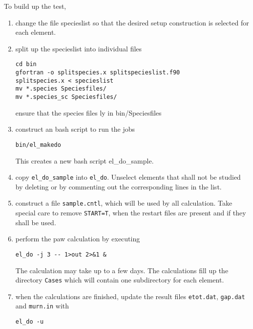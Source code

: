 \documentclass{book}
\begin{document}
To build up the test, 
\begin{enumerate}
\item change the file specieslist so that the desired setup
  construction is selected for each element.
%
\item split up the specieslist into individual files
\begin{verbatim}
cd bin
gfortran -o splitspecies.x splitspecieslist.f90
splitspecies.x < specieslist 
mv *.species Speciesfiles/
mv *.species_sc Speciesfiles/
\end{verbatim}
ensure that the species files ly in bin/Speciesfiles
%
\item construct an bash script to run the jobs
\begin{verbatim}
bin/el_makedo
\end{verbatim}
This creates a new bash script el\_do\_sample. 
%
\item copy \verb|el_do_sample| into \verb|el_do|. Unselect elements
  that shall not be studied by deleting or by commenting out the
  corresponding lines in the list.
%
\item construct a file \verb|sample.cntl|, which will be used by all
  calculation. Take special care to remove \verb|START=T|, when the
  restart files are present and if they shall be used.
%
\item perform the paw calculation by executing 
\begin{verbatim}
el_do -j 3 -- 1>out 2>&1 &
\end{verbatim}
The calculation may take up to a few days. The calculations fill up
the directory \verb|Cases| which will contain one subdirectory for
each element.
%
\item when the calculations are finished, update the result files \verb|etot.dat|, \verb|gap.dat| and \verb|murn.in| with
\begin{verbatim}
el_do -u
\end{verbatim}

\end{enumerate}
\end{document}
